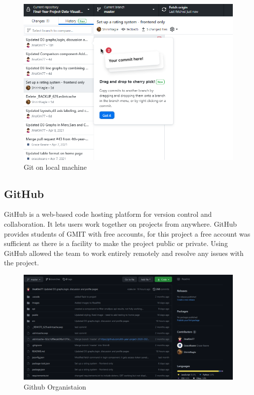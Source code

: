 \begin{figure}[H]
    \centering
    \includegraphics[scale=0.5]{img/git.PNG}
    \caption{Git on local machine}
    \label{fig:my_label01}
\end{figure}



\subsection{GitHub}
GitHub is a web-based code hosting platform for version control and collaboration. It lets users work together on projects from anywhere.\cite{github}
GitHub provides students of GMIT with free accounts, for this project a free account was sufficient as there is a facility to make the project public or private. Using GitHub allowed the team to work entirely remotely and resolve any issues with the project. 
\begin{figure}[H]
    \centering
    \includegraphics[scale=0.3]{img/github.PNG}
    \caption{Github Organistaion}
    \label{fig:my_label02}
\end{figure}






